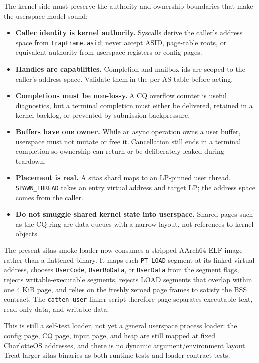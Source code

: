 The kernel side must preserve the authority and ownership boundaries that make
the userspace model sound:
\begin{itemize}
    \item \textbf{Caller identity is kernel authority.} Syscalls derive the
        caller's address space from \texttt{TrapFrame.asid}; never accept ASID,
        page-table roots, or equivalent authority from userspace registers or
        config pages.
    \item \textbf{Handles are capabilities.} Completion and mailbox ids are
        scoped to the caller's address space. Validate them in the per-AS table
        before acting.
    \item \textbf{Completions must be non-lossy.} A CQ overflow counter is
        useful diagnostics, but a terminal completion must either be delivered,
        retained in a kernel backlog, or prevented by submission backpressure.
    \item \textbf{Buffers have one owner.} While an async operation owns a user
        buffer, userspace must not mutate or free it. Cancellation still ends in
        a terminal completion so ownership can return or be deliberately leaked
        during teardown.
    \item \textbf{Placement is real.} A sitas shard maps to an LP-pinned user
        thread. \texttt{SPAWN\_THREAD} takes an entry virtual address and target
        LP; the address space comes from the caller.
    \item \textbf{Do not smuggle shared kernel state into userspace.} Shared
        pages such as the CQ ring are data queues with a narrow layout, not
        references to kernel objects.
\end{itemize}

The present sitas smoke loader now consumes a stripped AArch64 ELF image rather
than a flattened binary. It maps each \texttt{PT\_LOAD} segment at its linked
virtual address, chooses \texttt{UserCode}, \texttt{UserRoData}, or
\texttt{UserData} from the segment flags, rejects writable-executable segments,
rejects LOAD segments that overlap within one 4 KiB page, and relies on the
freshly zeroed page frames to satisfy the BSS contract. The
\texttt{catten-user} linker script therefore page-separates executable text,
read-only data, and writable data.

This is still a self-test loader, not yet a general userspace process loader:
the config page, CQ page, input page, and heap are still mapped at fixed
CharlotteOS addresses, and there is no dynamic argument/environment layout.
Treat larger sitas binaries as both runtime tests and loader-contract tests.

\endinput
